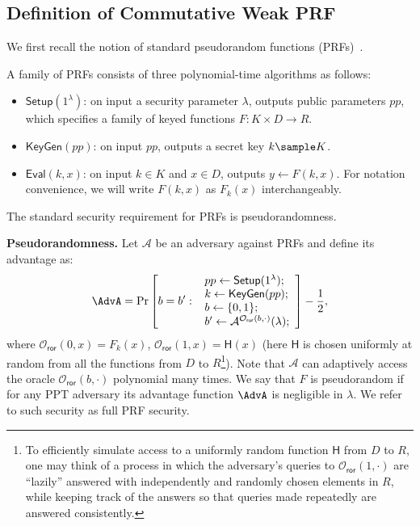 \documentclass[a4paper,10pt]{article}
\begin{document}
\subsection{Definition of Commutative Weak PRF}
We first recall the notion of standard pseudorandom functions (PRFs)~\cite{GGM-JACM-1986}. 
\begin{definition}[PRF]
A family of PRFs consists of three polynomial-time algorithms as follows: 
\begin{itemize}
\item $\mathsf{Setup}(1^\lambda)$: on input a security parameter $\lambda$, 
    outputs public parameters $pp$, which specifies a family of keyed functions $F: K \times D \rightarrow R$.

\item $\mathsf{KeyGen}(pp)$: on input $pp$, outputs a secret key $k \sample K$. 

\item $\mathsf{Eval}(k, x)$: on input $k \in K$ and $x \in D$, outputs $y \leftarrow F(k, x)$. 
    For notation convenience, we will write $F(k, x)$ as $F_k(x)$ interchangeably. 
\end{itemize}

The standard security requirement for PRFs is pseudorandomness. 
\begin{trivlist}
\item \textbf{Pseudorandomness.} Let $\mathcal{A}$ be an adversary against PRFs and define its advantage as:
\begin{displaymath}
    \AdvA =
        \Pr \left[ b = b':~
        \begin{array}{l}
            pp \leftarrow \mathsf{Setup}(1^\lambda);\\
            k \leftarrow \mathsf{KeyGen}(pp);\\
            b \leftarrow \{0,1\}; \\
            b' \leftarrow \mathcal{A}^{\mathcal{O}_\mathsf{ror}(b, \cdot)}(\lambda);
        \end{array} 
        \right] - \frac{1}{2},
\end{displaymath}
where $\mathcal{O}_\mathsf{ror}(0, x) = F_k(x)$, $\mathcal{O}_\mathsf{ror}(1, x) = \mathsf{H}(x)$ 
(here $\mathsf{H}$ is chosen uniformly at random from all the functions 
from $D$ to $R$\footnote{To efficiently simulate access to a uniformly random function $\mathsf{H}$ from $D$ to $R$, 
one may think of a process in which the adversary's queries to $\mathcal{O}_\mathsf{ror}(1, \cdot)$ 
are ``lazily'' answered with independently and randomly chosen elements in $R$, 
while keeping track of the answers so that queries made repeatedly are answered consistently.}). 
Note that $\mathcal{A}$ can adaptively access the oracle $\mathcal{O}_\mathsf{ror}(b, \cdot)$ polynomial many times.
We say that $F$ is pseudorandom if for any PPT adversary its advantage function 
$\AdvA$ is negligible in $\lambda$. We refer to such security as full PRF security. 
\end{trivlist}
\end{definition}
\end{document}
